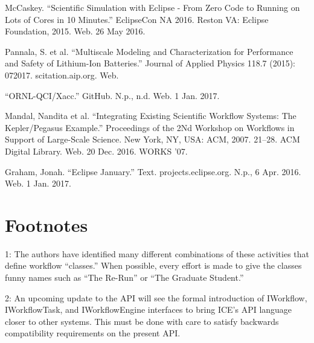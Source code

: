 McCaskey. ``Scientific Simulation with Eclipse - From Zero Code to
Running on Lots of Cores in 10 Minutes.'' EclipseCon NA 2016. Reston VA:
Eclipse Foundation, 2015. Web. 26 May 2016.

Pannala, S. et al. ``Multiscale Modeling and Characterization for
Performance and Safety of Lithium-Ion Batteries.'' Journal of Applied
Physics 118.7 (2015): 072017. scitation.aip.org. Web.

``ORNL-QCI/Xacc.'' GitHub. N.p., n.d. Web. 1 Jan. 2017.

Mandal, Nandita et al. ``Integrating Existing Scientific Workflow
Systems: The Kepler/Pegasus Example.'' Proceedings of the 2Nd Workshop
on Workflows in Support of Large-Scale Science. New York, NY, USA: ACM,
2007. 21--28. ACM Digital Library. Web. 20 Dec. 2016. WORKS '07.

Graham, Jonah. ``Eclipse January.'' Text. projects.eclipse.org. N.p., 6
Apr. 2016. Web. 1 Jan. 2017.

\section{Footnotes}\label{footnotes}

1: The authors have identified many different combinations of these
activities that define workflow ``classes.'' When possible, every effort
is made to give the classes funny names such as ``The Re-Run'' or ``The
Graduate Student.''

2: An upcoming update to the API will see the formal introduction of
IWorkflow, IWorkflowTask, and IWorkflowEngine interfaces to bring ICE's
API language closer to other systems. This must be done with care to
satisfy backwards compatibility requirements on the present API.
